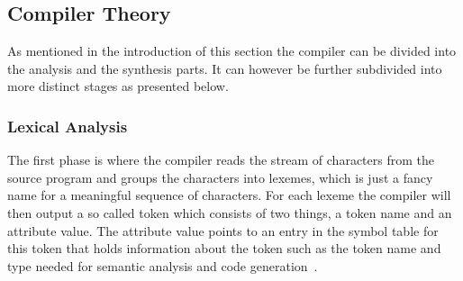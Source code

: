 \documentclass{sigchi}
\begin{document}

\subsection{Compiler Theory}
As mentioned in the introduction of this section the compiler can be divided into the analysis and the synthesis parts. It can however be further subdivided into more distinct stages as presented below.

\subsubsection{Lexical Analysis}
The first phase is where the compiler reads the stream of characters from the source program and groups the characters into lexemes, which is just a fancy name for a meaningful sequence of characters. For each lexeme the compiler will then output a so called token which consists of two things, a token name and an attribute value. The attribute value points to an entry in the symbol table for this token that holds information about the token such as the token name and type needed for semantic analysis and code generation~\cite{dragon}.

\end{document}
